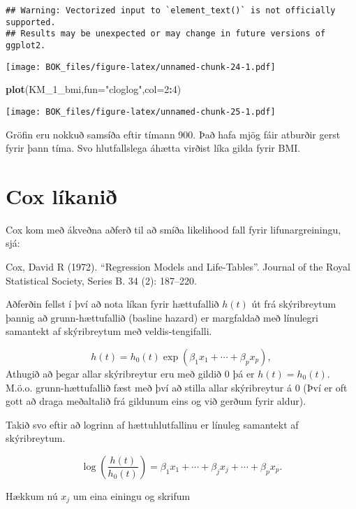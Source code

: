 \documentclass[
]{book}
\newenvironment{Shaded}{\begin{snugshade}}{\end{snugshade}}
\newcommand{\DataTypeTok}[1]{\textcolor[rgb]{0.13,0.29,0.53}{#1}}
\newcommand{\DecValTok}[1]{\textcolor[rgb]{0.00,0.00,0.81}{#1}}
\newcommand{\KeywordTok}[1]{\textcolor[rgb]{0.13,0.29,0.53}{\textbf{#1}}}
\newcommand{\NormalTok}[1]{#1}
\newcommand{\OperatorTok}[1]{\textcolor[rgb]{0.81,0.36,0.00}{\textbf{#1}}}
\newcommand{\StringTok}[1]{\textcolor[rgb]{0.31,0.60,0.02}{#1}}
\begin{document}
\begin{verbatim}
## Warning: Vectorized input to `element_text()` is not officially supported.
## Results may be unexpected or may change in future versions of ggplot2.
\end{verbatim}

\texttt{[image: BOK\_files/figure-latex/unnamed-chunk-24-1.pdf]}

\begin{Shaded}
\begin{Highlighting}[]
\KeywordTok{plot}\NormalTok{(KM_}\DecValTok{1}\NormalTok{_bmi,}\DataTypeTok{fun=}\StringTok{"cloglog"}\NormalTok{,}\DataTypeTok{col=}\DecValTok{2}\OperatorTok{:}\DecValTok{4}\NormalTok{)}
\end{Highlighting}
\end{Shaded}

\texttt{[image: BOK\_files/figure-latex/unnamed-chunk-25-1.pdf]}

Gröfin eru nokkuð samsíða eftir tímann 900. Það hafa mjög fáir atburðir gerst fyrir þann tíma. Svo hlutfallslega áhætta virðist líka gilda fyrir BMI.

\hypertarget{cox}{%
\chapter{Cox líkanið}\label{cox}}

Cox kom með ákveðna aðferð til að smíða likelihood fall fyrir lifunargreiningu, sjá:

Cox, David R (1972). ``Regression Models and Life-Tables''. Journal of the Royal Statistical Society, Series B. 34 (2): 187--220.

Aðferðin fellst í því að nota líkan fyrir hættufallið \(h(t)\) út frá skýribreytum þannig að grunn-hættufallið (basline hazard) er margfaldað með línulegri samantekt af skýribreytum með veldis-tengifalli.

\[
h(t) = h_0(t) \exp(\beta_1 x_1 + \cdots + \beta_p x_p),
\]
Athugið að þegar allar skýribreytur eru með gildið 0 þá er \(h(t) = h_0(t)\). M.ö.o. grunn-hættufallið fæst með því að stilla allar skýribreytur á 0 (Því er oft gott að draga meðaltalið frá gildunum eins og við gerðum fyrir aldur).

Takið svo eftir að logrinn af hættuhlutfallinu er línuleg samantekt af skýribreytum.

\[
\log \left( \frac{h(t)}{h_0(t)} \right) = \beta_1 x_1 + \cdots + \beta_j x_j + \cdots + \beta_p x_p.
\]

Hækkum nú \(x_j\) um eina einingu og skrifum
\end{document}
